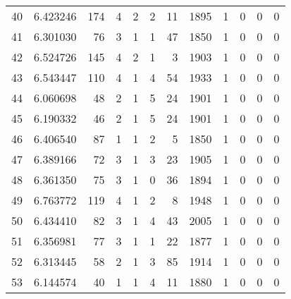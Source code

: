 \begin{tabular}{lrrrrrrrrrrr}
40  &  6.423246 &  174 &      4 &        2 &      2 &              11 &  1895 &               1 &               0 &               0 &               0 \\
41  &  6.301030 &   76 &      3 &        1 &      1 &              47 &  1850 &               1 &               0 &               0 &               0 \\
42  &  6.524726 &  145 &      4 &        2 &      1 &               3 &  1903 &               1 &               0 &               0 &               0 \\
43  &  6.543447 &  110 &      4 &        1 &      4 &              54 &  1933 &               1 &               0 &               0 &               0 \\
44  &  6.060698 &   48 &      2 &        1 &      5 &              24 &  1901 &               1 &               0 &               0 &               0 \\
45  &  6.190332 &   46 &      2 &        1 &      5 &              24 &  1901 &               1 &               0 &               0 &               0 \\
46  &  6.406540 &   87 &      1 &        1 &      2 &               5 &  1850 &               1 &               0 &               0 &               0 \\
47  &  6.389166 &   72 &      3 &        1 &      3 &              23 &  1905 &               1 &               0 &               0 &               0 \\
48  &  6.361350 &   75 &      3 &        1 &      0 &              36 &  1894 &               1 &               0 &               0 &               0 \\
49  &  6.763772 &  119 &      4 &        1 &      2 &               8 &  1948 &               1 &               0 &               0 &               0 \\
50  &  6.434410 &   82 &      3 &        1 &      4 &              43 &  2005 &               1 &               0 &               0 &               0 \\
51  &  6.356981 &   77 &      3 &        1 &      1 &              22 &  1877 &               1 &               0 &               0 &               0 \\
52  &  6.313445 &   58 &      2 &        1 &      3 &              85 &  1914 &               1 &               0 &               0 &               0 \\
53  &  6.144574 &   40 &      1 &        1 &      4 &              11 &  1880 &               1 &               0 &               0 &               0 \\

\end{tabular}
